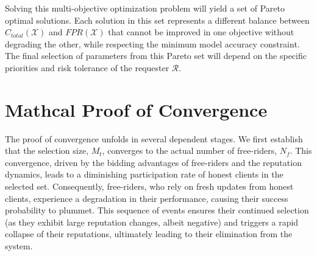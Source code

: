 \documentclass[conference]{IEEEtran}
\begin{document}
Solving this multi-objective optimization problem will yield a set of Pareto optimal solutions. Each solution in this set represents a different balance between $C_{total}(\mathcal{X})$ and $FPR(\mathcal{X})$ that cannot be improved in one objective without degrading the other, while respecting the minimum model accuracy constraint. The final selection of parameters from this Pareto set will depend on the specific priorities and risk tolerance of the requester $\mathcal{R}$.

\section{Mathcal Proof of Convergence}
\label{sec:convergence_proof}

The proof of convergence unfolds in several dependent stages. We first establish that the selection size, $M_t$, converges to the actual number of free-riders, $N_f$. This convergence, driven by the bidding advantages of free-riders and the reputation dynamics, leads to a diminishing participation rate of honest clients in the selected set. Consequently, free-riders, who rely on fresh updates from honest clients, experience a degradation in their performance, causing their success probability to plummet. This sequence of events ensures their continued selection (as they exhibit large reputation changes, albeit negative) and triggers a rapid collapse of their reputations, ultimately leading to their elimination from the system.
\end{document}
